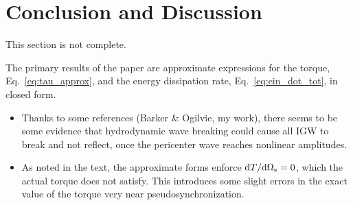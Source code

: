 \documentclass[
        fleqn,
        usenatbib,
    ]{mnras}
\newcommand*{\rdil}[2]{\mathrm{d}#1 / \mathrm{d}#2}
\begin{document}




\section{Conclusion and Discussion}\label{s:disc}

\textcolor{Corr}{This section is not complete.}

The primary results of the paper are approximate expressions for the torque,
Eq.~\eqref{eq:tau_approx}, and the energy dissipation rate,
Eq.~\eqref{eq:ein_dot_tot}, in closed form.

\begin{itemize}
    \item Thanks to some references (Barker \& Ogilvie, my work), there seems to
        be some evidence that hydrodynamic wave breaking could cause all IGW to
        break and not reflect, once the pericenter wave reaches nonlinear
        amplitudes.

    \item As noted in the text, the approximate forms enforce
        $\rdil{T}{\Omega_{\rm s}} = 0$, which the actual torque does not satisfy.
        This introduces some slight errors in the exact value of the torque very
        near pseudosynchronization.
\end{itemize}
\end{document}
